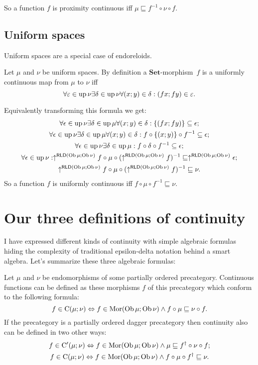So a function $f$ is proximity continuous iff $\mu\sqsubseteq f^{-1}\circ\nu\circ f$.


\subsection{Uniform spaces}

Uniform spaces are a special case of endoreloids.

Let $\mu$ and $\nu$ be uniform spaces. By definition a $\mathbf{Set}$-morphism~$f$
is a uniformly continuous map from $\mu$ to $\nu$ iff 
\[
\forall\varepsilon\in\operatorname{up}\nu\exists\delta\in\operatorname{up}\nu\forall(x;y)\in\delta:(fx;fy)\in\varepsilon.
\]


Equivalently transforming this formula we get:
\begin{gather*}
\forall\epsilon\in\operatorname{up}\nu\exists\delta\in\operatorname{up}\mu\forall(x;y)\in\delta:\{(fx;fy)\}\subseteq\epsilon;\\
\forall\epsilon\in\operatorname{up}\nu\exists\delta\in\operatorname{up}\mu\forall(x;y)\in\delta:f\circ\{(x;y)\}\circ f^{-1}\subseteq\epsilon;\\
\forall\epsilon\in\operatorname{up}\nu\exists\delta\in\operatorname{up}\mu:f\circ\delta\circ f^{-1}\subseteq\epsilon;\\
\forall\epsilon\in\operatorname{up}\nu:\uparrow^{\mathsf{RLD}(\operatorname{Ob}\mu;\operatorname{Ob}\nu)}f\circ\mu\circ(\uparrow^{\mathsf{RLD}(\operatorname{Ob}\mu;\operatorname{Ob}\nu)}f)^{-1}\sqsubseteq\uparrow^{\mathsf{RLD}(\operatorname{Ob}\mu;\operatorname{Ob}\nu)}\epsilon;\\
\uparrow^{\mathsf{RLD}(\operatorname{Ob}\mu;\operatorname{Ob}\nu)}f\circ\mu\circ(\uparrow^{\mathsf{RLD}(\operatorname{Ob}\mu;\operatorname{Ob}\nu)}f)^{-1}\sqsubseteq\nu.
\end{gather*}
So a function $f$ is uniformly continuous iff $f\circ\mu\circ f^{-1}\sqsubseteq\nu$.


\section{Our three definitions of continuity}

I have expressed different kinds of continuity with simple algebraic
formulas hiding the complexity of traditional epsilon-delta notation
behind a smart algebra. Let's summarize these three algebraic formulas:

Let $\mu$ and $\nu$ be endomorphisms of some partially ordered precategory.
Continuous functions can be defined as these morphisms $f$ of this
precategory which conform to the following formula:
\[
f\in\mathrm{C}(\mu;\nu)\Leftrightarrow f\in\operatorname{Mor}(\operatorname{Ob}\mu;\operatorname{Ob}\nu)\land f\circ\mu\sqsubseteq\nu\circ f.
\]
If the precategory is a partially ordered dagger precategory then
continuity also can be defined in two other ways:
\begin{gather*}
f\in\mathrm{C}'(\mu;\nu)\Leftrightarrow f\in\operatorname{Mor}(\operatorname{Ob}\mu;\operatorname{Ob}\nu)\land\mu\sqsubseteq f^{\dagger}\circ\nu\circ f;\\
f\in\mathrm{C}(\mu;\nu)\Leftrightarrow f\in\operatorname{Mor}(\operatorname{Ob}\mu;\operatorname{Ob}\nu)\land f\circ\mu\circ f^{\dagger}\sqsubseteq\nu.
\end{gather*}

